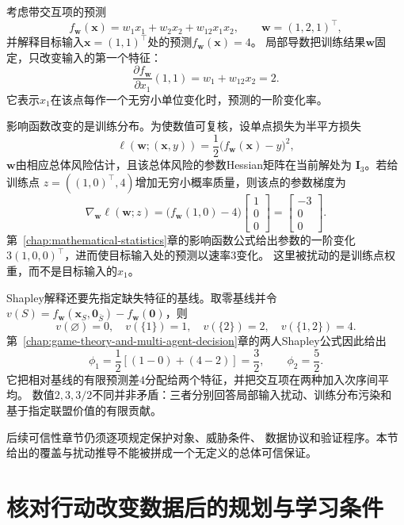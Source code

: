 \begin{example}[同一预测上的三种解释对象]
  \label{ex:future-explanation-three-objects}
  考虑带交互项的预测
  \[
    f_{\bm w}(\bm x)
    =
    w_1x_1+w_2x_2+w_{12}x_1x_2,
    \qquad
    \bm w=(1,2,1)^{\top},
  \]
  并解释目标输入\(\bm x=(1,1)^{\top}\)处的预测\(f_{\bm w}(\bm x)=4\)。
  局部导数把训练结果\(\bm w\)固定，只改变输入的第一个特征：
  \[
    \frac{\partial f_{\bm w}}{\partial x_1}(1,1)
    =
    w_1+w_{12}x_2
    =
    2.
  \]
  它表示\(x_1\)在该点每作一个无穷小单位变化时，预测的一阶变化率。

  影响函数改变的是训练分布。为使数值可复核，设单点损失为半平方损失
  \[
    \ell(\bm w;(\bm x,y))
    =
    \frac12\bigl(f_{\bm w}(\bm x)-y\bigr)^2,
  \]
  \(\bm w\)由相应总体风险估计，且该总体风险的参数Hessian矩阵在当前解处为
  \(\bm I_3\)。若给训练点
  \(z=((1,0)^{\top},4)\)增加无穷小概率质量，则该点的参数梯度为
  \[
    \nabla_{\bm w}\ell(\bm w;z)
    =
    \bigl(f_{\bm w}(1,0)-4\bigr)
    \begin{bmatrix}1\\0\\0\end{bmatrix}
    =
    \begin{bmatrix}-3\\0\\0\end{bmatrix}.
  \]
  第~\ref{chap:mathematical-statistics}章的影响函数公式给出参数的一阶变化
  \(3(1,0,0)^{\top}\)，进而使目标输入处的预测以速率\(3\)变化。
  这里被扰动的是训练点权重，而不是目标输入的\(x_1\)。

  Shapley解释还要先指定缺失特征的基线。取零基线并令
  \(v(S)=f_{\bm w}(\bm x_S,\bm0_{\bar S})-f_{\bm w}(\bm0)\)，则
  \[
    v(\varnothing)=0,\quad
    v(\{1\})=1,\quad
    v(\{2\})=2,\quad
    v(\{1,2\})=4.
  \]
  第~\ref{chap:game-theory-and-multi-agent-decision}章的两人Shapley公式因此给出
  \[
    \phi_1
    =
    \frac12[(1-0)+(4-2)]
    =
    \frac32,
    \qquad
    \phi_2=\frac52.
  \]
  它把相对基线的有限预测差\(4\)分配给两个特征，并把交互项在两种加入次序间平均。
  数值\(2,3,3/2\)不同并非矛盾：三者分别回答局部输入扰动、训练分布污染和
  基于指定联盟价值的有限贡献。
\end{example}

后续可信性章节仍须逐项规定保护对象、威胁条件、
数据协议和验证程序。本节给出的覆盖与扰动推导不能被拼成一个无定义的总体可信保证。

\section{核对行动改变数据后的规划与学习条件}
\label{sec:future-reinforcement-learning-sequential-decision}

